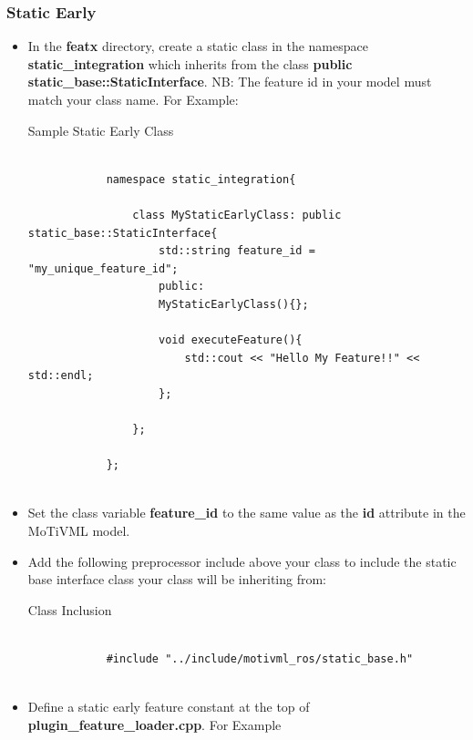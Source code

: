 \documentclass{article}
\newenvironment{longlisting}{\captionsetup{type=listing}}{}
\begin{document}
\subsubsection{Static Early}
\begin{itemize}
	\item In the \textbf{featx} directory, create a static class in the namespace \textbf{static\_integration} which inherits from the class \textbf{public static\_base::StaticInterface}. NB: The feature id in your model must match your class name. For Example:
	
	\begin{longlisting}
		\caption{Sample Static Early Class}
		\begin{verbatim}
			
			namespace static_integration{
				
				class MyStaticEarlyClass: public static_base::StaticInterface{
					std::string feature_id = "my_unique_feature_id";
					public:
					MyStaticEarlyClass(){};
					
					void executeFeature(){
						std::cout << "Hello My Feature!!" << std::endl;
					};
					
				};
				
			};
			
		\end{verbatim}
		\label{samplestaticearly}
	\end{longlisting}
	\item Set the class variable \textbf{feature\_id} to the same value as the \textbf{id} attribute in the MoTiVML model.
	\item Add the following preprocessor include above your class to include the static base interface class your class will be inheriting from:
	\begin{longlisting}
		\caption{Class Inclusion}
		\begin{verbatim}
			
			#include "../include/motivml_ros/static_base.h"
			
		\end{verbatim}
		\label{classinclude}
	\end{longlisting}
	\item Define a static early feature constant at the top of \textbf{plugin\_feature\_loader.cpp}. For Example
	

\end{itemize}
\end{document}

